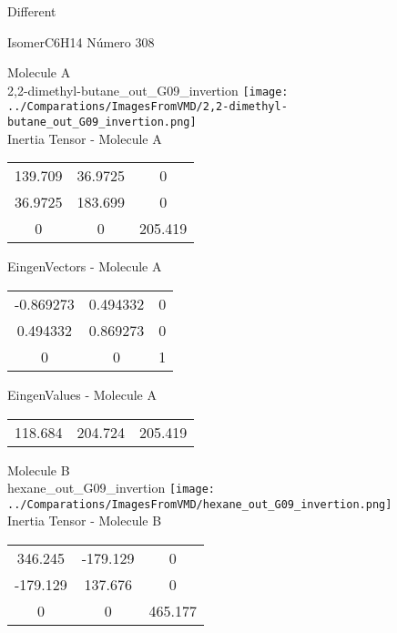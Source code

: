 \begin{center}
\vtab
\vtab
\textcolor{NavyBlue}{\Large Different}
\end{center}

 \newpage

\vtab[-2cm]
\begin{center}
{\large IsomerC6H14 \tab Número 308}
\end{center}
\begin{multicols}{2}
\begin{center}

Molecule A \\ 
2,2-dimethyl-butane\_out\_G09\_invertion
\texttt{[image: ../Comparations/ImagesFromVMD/2,2-dimethyl-butane\_out\_G09\_invertion.png]}
\\
Inertia Tensor - Molecule A \\
\vtab

\begin{tabular}{|c c c|}
139.709	 & 	36.9725	 & 	0	 \\
36.9725	 & 	183.699	 & 	0	 \\
0	 & 	0	 & 	205.419
\end{tabular}

\vtab
 EingenVectors - Molecule A     \\
\vtab
\begin{tabular}{|c c c|}
-0.869273	 & 	0.494332	 & 	0	 \\
0.494332	 & 	0.869273	 & 	0	 \\
0	 & 	0	 & 	1
\end{tabular}

\vtab
 EingenValues - Molecule A     \\
\vtab
\begin{tabular}{|c c c|}
118.684	 & 	204.724	 & 	205.419	 \\
\end{tabular}
\columnbreak

Molecule B \\ 
hexane\_out\_G09\_invertion
\texttt{[image: ../Comparations/ImagesFromVMD/hexane\_out\_G09\_invertion.png]}
\\
Inertia Tensor - Molecule B \\
\vtab

\begin{tabular}{|c c c|}
346.245	 & 	-179.129	 & 	0	 \\
-179.129	 & 	137.676	 & 	0	 \\
0	 & 	0	 & 	465.177
\end{tabular}


\end{center}
\end{multicols}
